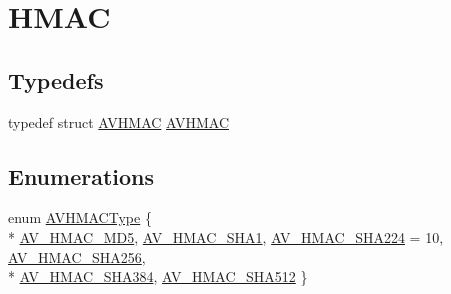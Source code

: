 \hypertarget{group__lavu__hmac}{}\section{H\+M\+AC}
\label{group__lavu__hmac}
\subsection*{Typedefs}
\begin{DoxyCompactItemize}
\item 
typedef struct \hyperlink{group__lavu__hmac_gad8c944f9437e65d8e8ebc526bdeee676}{A\+V\+H\+M\+AC} \hyperlink{group__lavu__hmac_gad8c944f9437e65d8e8ebc526bdeee676}{A\+V\+H\+M\+AC}
\end{DoxyCompactItemize}
\subsection*{Enumerations}
\begin{DoxyCompactItemize}
\item 
enum \hyperlink{group__lavu__hmac_gaec34f18155d20236c9f39961bb58f7d4}{A\+V\+H\+M\+A\+C\+Type} \{ \\*
\hyperlink{group__lavu__hmac_ggaec34f18155d20236c9f39961bb58f7d4a063ecd7e758d4abcd438aba0b9708c7a}{A\+V\+\_\+\+H\+M\+A\+C\+\_\+\+M\+D5}, 
\hyperlink{group__lavu__hmac_ggaec34f18155d20236c9f39961bb58f7d4a421f7f38b635e8d5ef1cc45d1867d5a7}{A\+V\+\_\+\+H\+M\+A\+C\+\_\+\+S\+H\+A1}, 
\hyperlink{group__lavu__hmac_ggaec34f18155d20236c9f39961bb58f7d4a283c3d421f8279ec3530d0bd0cb56313}{A\+V\+\_\+\+H\+M\+A\+C\+\_\+\+S\+H\+A224} = 10, 
\hyperlink{group__lavu__hmac_ggaec34f18155d20236c9f39961bb58f7d4a2f0a1a712c6e85b5149baa0780dcda4c}{A\+V\+\_\+\+H\+M\+A\+C\+\_\+\+S\+H\+A256}, 
\\*
\hyperlink{group__lavu__hmac_ggaec34f18155d20236c9f39961bb58f7d4a268dfcdccbe89e48a662989087728ff7}{A\+V\+\_\+\+H\+M\+A\+C\+\_\+\+S\+H\+A384}, 
\hyperlink{group__lavu__hmac_ggaec34f18155d20236c9f39961bb58f7d4a811a3754bdc32d9e258c6504759a6608}{A\+V\+\_\+\+H\+M\+A\+C\+\_\+\+S\+H\+A512}
 \}
\end{DoxyCompactItemize}
